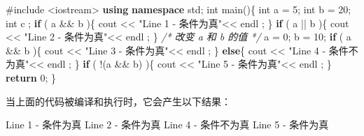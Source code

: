 \documentclass[
]{article}
\newenvironment{Shaded}{}{}
\newcommand{\CommentTok}[1]{\textcolor[rgb]{0.38,0.63,0.69}{\textit{#1}}}
\newcommand{\ControlFlowTok}[1]{\textcolor[rgb]{0.00,0.44,0.13}{\textbf{#1}}}
\newcommand{\DataTypeTok}[1]{\textcolor[rgb]{0.56,0.13,0.00}{#1}}
\newcommand{\DecValTok}[1]{\textcolor[rgb]{0.25,0.63,0.44}{#1}}
\newcommand{\ImportTok}[1]{#1}
\newcommand{\KeywordTok}[1]{\textcolor[rgb]{0.00,0.44,0.13}{\textbf{#1}}}
\newcommand{\NormalTok}[1]{#1}
\newcommand{\OperatorTok}[1]{\textcolor[rgb]{0.40,0.40,0.40}{#1}}
\newcommand{\PreprocessorTok}[1]{\textcolor[rgb]{0.74,0.48,0.00}{#1}}
\newcommand{\StringTok}[1]{\textcolor[rgb]{0.25,0.44,0.63}{#1}}
\begin{document}
\begin{Shaded}
\begin{Highlighting}[]
\PreprocessorTok{\#include }\ImportTok{\textless{}iostream\textgreater{}}
\KeywordTok{using} \KeywordTok{namespace}\NormalTok{ std}\OperatorTok{;} 
\DataTypeTok{int}\NormalTok{ main}\OperatorTok{()\{}
   \DataTypeTok{int}\NormalTok{ a }\OperatorTok{=} \DecValTok{5}\OperatorTok{;}   \DataTypeTok{int}\NormalTok{ b }\OperatorTok{=} \DecValTok{20}\OperatorTok{;}   \DataTypeTok{int}\NormalTok{ c }\OperatorTok{;} 
   \ControlFlowTok{if} \OperatorTok{(}\NormalTok{ a }\OperatorTok{\&\&}\NormalTok{ b }\OperatorTok{)\{}
\NormalTok{      cout }\OperatorTok{\textless{}\textless{}} \StringTok{"Line 1 {-} 条件为真"}\OperatorTok{\textless{}\textless{}}\NormalTok{ endl }\OperatorTok{;}
   \OperatorTok{\}}
   \ControlFlowTok{if} \OperatorTok{(}\NormalTok{ a }\OperatorTok{||}\NormalTok{ b }\OperatorTok{)\{}
\NormalTok{      cout }\OperatorTok{\textless{}\textless{}} \StringTok{"Line 2 {-} 条件为真"}\OperatorTok{\textless{}\textless{}}\NormalTok{ endl }\OperatorTok{;}
   \OperatorTok{\}}
   \CommentTok{/* 改变 a 和 b 的值 */}
\NormalTok{   a }\OperatorTok{=} \DecValTok{0}\OperatorTok{;}\NormalTok{   b }\OperatorTok{=} \DecValTok{10}\OperatorTok{;}
   \ControlFlowTok{if} \OperatorTok{(}\NormalTok{ a }\OperatorTok{\&\&}\NormalTok{ b }\OperatorTok{)\{}
\NormalTok{      cout }\OperatorTok{\textless{}\textless{}} \StringTok{"Line 3 {-} 条件为真"}\OperatorTok{\textless{}\textless{}}\NormalTok{ endl }\OperatorTok{;}
   \OperatorTok{\}}
   \ControlFlowTok{else}\OperatorTok{\{}
\NormalTok{      cout }\OperatorTok{\textless{}\textless{}} \StringTok{"Line 4 {-} 条件不为真"}\OperatorTok{\textless{}\textless{}}\NormalTok{ endl }\OperatorTok{;}
   \OperatorTok{\}}
   \ControlFlowTok{if} \OperatorTok{(} \OperatorTok{!(}\NormalTok{a }\OperatorTok{\&\&}\NormalTok{ b}\OperatorTok{)} \OperatorTok{)\{}
\NormalTok{      cout }\OperatorTok{\textless{}\textless{}} \StringTok{"Line 5 {-} 条件为真"}\OperatorTok{\textless{}\textless{}}\NormalTok{ endl }\OperatorTok{;}
   \OperatorTok{\}}
   \ControlFlowTok{return} \DecValTok{0}\OperatorTok{;}
\OperatorTok{\}}
\end{Highlighting}
\end{Shaded}

当上面的代码被编译和执行时，它会产生以下结果：

\begin{Shaded}
\begin{Highlighting}[]
\NormalTok{Line }\DecValTok{1} \OperatorTok{{-}}\NormalTok{ 条件为真}
\NormalTok{Line }\DecValTok{2} \OperatorTok{{-}}\NormalTok{ 条件为真}
\NormalTok{Line }\DecValTok{4} \OperatorTok{{-}}\NormalTok{ 条件不为真}
\NormalTok{Line }\DecValTok{5} \OperatorTok{{-}}\NormalTok{ 条件为真}
\end{Highlighting}
\end{Shaded}
\end{document}
